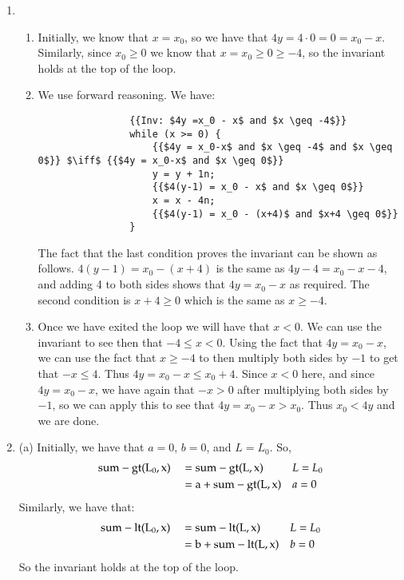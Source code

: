\documentclass[12pt]{article}
\theoremstyle{definitionstyle}
\begin{document}
\begin{enumerate}[labelindent=0pt, labelwidth=!, wide]
        \newpage
        \item \begin{enumerate}[label=(\alph*)]
            \item Initially, we know that $x = x_0$, so we have that $4y = 4 \cdot 0 = 0 = x_0 - x$. Similarly, since $x_0 \geq 0$ we know that $x = x_0 \geq 0 \geq -4$, so the invariant holds at the top of the loop.
            \item We use forward reasoning. We have:
            \begin{lstlisting}
                {{Inv: $4y =x_0 - x$ and $x \geq -4$}}
                while (x >= 0) {
                    {{$4y = x_0-x$ and $x \geq -4$ and $x \geq 0$}} $\iff$ {{$4y = x_0-x$ and $x \geq 0$}} 
                    y = y + 1n;
                    {{$4(y-1) = x_0 - x$ and $x \geq 0$}}
                    x = x - 4n;
                    {{$4(y-1) = x_0 - (x+4)$ and $x+4 \geq 0$}}
                }
            \end{lstlisting}
            The fact that the last condition proves the invariant can be shown as follows. $4(y-1) = x_0 - (x+4)$ is the same as $4y - 4 = x_0 - x - 4$, and adding 4 to both sides shows that $4y = x_0 - x$ as required. The second condition is $x + 4 \geq 0$ which is the same as $x \geq -4$.
            \item Once we have exited the loop we will have that $x < 0$. We can use the invariant to see then that $-4 \leq x < 0$. Using the fact that $4y = x_0 - x$, we can use the fact that $x \geq -4$ to then multiply both sides by $-1$ to get that $-x \leq 4$. Thus $4y = x_0 - x \leq x_0 + 4$. Since $x < 0$ here, and since $4y = x_0 - x$, we have again that $-x > 0$ after multiplying both sides by $-1$, so we can apply this to see that $4y = x_0 - x > x_0$. Thus $x_0 < 4y$ and we are done.
        \end{enumerate}
        \item
            (a) Initially, we have that $a = 0$, $b = 0$, and $L = L_0$. So,
            \begin{align*}
                \begin{aligned}
                    &\rm sum-gt(L_0, x) &&= \rm sum-gt(L, x) && \text{$L = L_0$} \\
                    &&&= \rm a + sum-gt(L, x) && \text{$a = 0$}
                \end{aligned}
            \end{align*}
            Similarly, we have that:
            \begin{align*}
                \begin{aligned}
                    &\rm sum-lt(L_0, x) &&= \rm sum-lt(L, x) && \text{$L = L_0$} \\
                    &&&= \rm b + sum-lt(L, x) && \text{$b = 0$}
                \end{aligned}
            \end{align*}
            So the invariant holds at the top of the loop. 


\end{enumerate}
\end{document}
